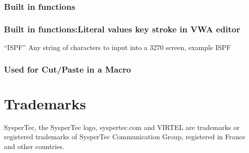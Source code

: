 \documentclass[letterpaper,10pt,english]{sphinxmanual}
\begin{document}
\subsection{Built in functions}
\label{\detokenize{Customization:built-in-functions}}
\begin{sphinxVerbatim}[commandchars=\\\{\}]
            
\end{sphinxVerbatim}


\subsection{Built in functions:Literal values \sphinxhyphen{} key stroke in VWA editor}
\label{\detokenize{Customization:built-in-functions-literal-values-key-stroke-in-vwa-editor}}\begin{description}
\sphinxlineitem{::}
\sphinxAtStartPar
“ISPF”          Any string of characters to input into a 3270 screen, example ISPF

\end{description}


\subsection{Used for Cut/Paste in a Macro}
\label{\detokenize{Customization:used-for-cut-paste-in-a-macro}}
\begin{sphinxVerbatim}[commandchars=\\\{\}]
\end{sphinxVerbatim}


\chapter{Trademarks}
\label{\detokenize{Customization:trademarks}}
\sphinxAtStartPar
SysperTec, the SysperTec logo, syspertec.com and VIRTEL are trademarks or registered trademarks of SysperTec
Communication Group, registered in France and other countries.
\end{document}
